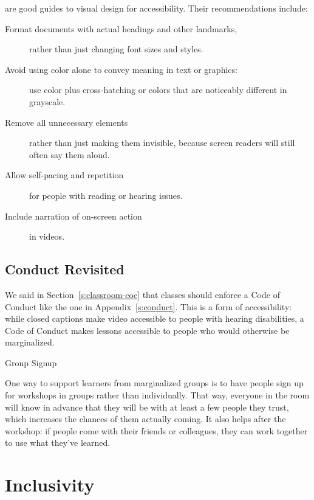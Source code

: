 \cite{Coom2012,Burg2015} are good guides to visual design for
accessibility. Their recommendations include:

\begin{description}
\item[Format documents with actual headings and other landmarks,]
rather than just changing font sizes and styles.
\item[Avoid using color alone to convey meaning in text or graphics:]
use color plus cross-hatching or colors that are noticeably
different in grayscale.
\item[Remove all unnecessary elements]
rather than just making them invisible, because screen readers will
still often say them aloud.
\item[Allow self-pacing and repetition]
for people with reading or hearing issues.
\item[Include narration of on-screen action]
in videos.
\end{description}

\subsection{Conduct Revisited}\label{conduct-revisited}

We said in Section~\ref{s:classroom-coc} that classes should
enforce a Code of Conduct like the one in Appendix~\ref{s:conduct}. This
is a form of accessibility: while closed captions make video accessible
to people with hearing disabilities, a Code of Conduct makes lessons
accessible to people who would otherwise be marginalized.

\begin{aside}{Group Signup}

One way to support learners from marginalized groups is to have people
sign up for workshops in groups rather than individually. That way,
everyone in the room will know in advance that they will be with at
least a few people they trust, which increases the chances of them
actually coming. It also helps after the workshop: if people come with
their friends or colleagues, they can work together to use what
they've learned.

\end{aside}

\section{Inclusivity}\label{s:motivation-inclusivity}

